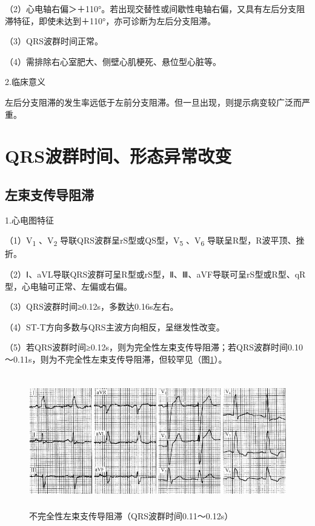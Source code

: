 （2）心电轴右偏＞＋110°。若出现交替性或间歇性电轴右偏，又具有左后分支阻滞特征，即使未达到＋110°，亦可诊断为左后分支阻滞。

（3）QRS波群时间正常。

（4）需排除右心室肥大、侧壁心肌梗死、悬位型心脏等。

2.临床意义

左后分支阻滞的发生率远低于左前分支阻滞。但一旦出现，则提示病变较广泛而严重。

\protect\hypertarget{text00009.htmlux5cux23subid54}{}{}

\section{QRS波群时间、形态异常改变}

\protect\hypertarget{text00009.htmlux5cux23subid55}{}{}

\subsection{左束支传导阻滞}

1.心电图特征

（1）V\textsubscript{1} 、V\textsubscript{2}
导联QRS波群呈rS型或QS型，V\textsubscript{5} 、V\textsubscript{6}
导联呈R型，R波平顶、挫折。

（2）Ⅰ、aVL导联QRS波群可呈R型或rS型，Ⅱ、Ⅲ、aVF导联可呈rS型或R型、qR型，心电轴可正常、左偏或右偏。

（3）QRS波群时间≥0.12s，多数达0.16s左右。

（4）ST-T方向多数与QRS主波方向相反，呈继发性改变。

（5）若QRS波群时间≥0.12s，则为完全性左束支传导阻滞；若QRS波群时间0.10～0.11s，则为不完全性左束支传导阻滞，但较罕见（图\ref{fig3-12}）。

\begin{figure}[!htbp]
 \centering
 \includegraphics[width=5.58333in,height=2.29167in]{./images/Image00062.jpg}
 \captionsetup{justification=centering}
 \caption{不完全性左束支传导阻滞（QRS波群时间0.11～0.12s）}
 \label{fig3-12}
  \end{figure} 


